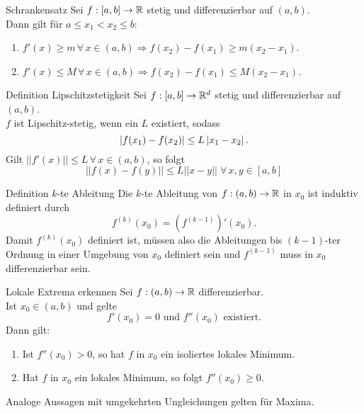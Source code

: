 \documentclass[main.tex]{subfiles}
\begin{document}
\begin{karte}{Schrankensatz}
    Sei \( f: [a,b] \rightarrow \mathbb{R} \) stetig und differenzierbar 
    auf \( (a,b) \).\\
    Dann gilt für \( a \leq x_1 < x_2 \leq b \): 
    \begin{enumerate}
        \item \( f'(x) \geq m \,\forall \, x \in (a,b) 
        \Rightarrow f(x_2) - f(x_1) \geq m(x_2 - x_1) \).
        \item \( f'(x) \leq M \, \forall \, x\in (a,b) 
        \Rightarrow f(x_2) - f(x_1) \leq M(x_2 - x_1) \).
    \end{enumerate}
\end{karte}
\begin{karte}{Definition Lipschitzstetigkeit}
    Sei \( f: [a,b] \rightarrow \mathbb{R}^d \) stetig und 
    differenzierbar auf \( (a,b) \). \\
    \( f \) ist Lipschitz-stetig, wenn ein \(L\) 
    existiert, sodass 
    \[ \left|  f(x_1) - f(x_2)  \right| \leq L \left| x_1 - x_2 \right|. \]
    Gilt \( ||f'(x)|| \leq L \, \forall \, x \in (a,b) \), 
    so folgt 
    \[ ||f(x) - f(y)|| \leq L ||x-y|| 
    \; \forall \, x,y \in [a,b] \]
\end{karte}
\begin{karte}{Definition \(k\)-te Ableitung}
    Die \( k \)-te Ableitung von 
    \( f: (a,b) \rightarrow \mathbb{R} \) in \( x_0 \) ist 
    induktiv definiert durch 
    \[ f^{(k)}(x_0) = (f^{(k-1)})'(x_0). \]
    Damit \( f^{(k)}(x_0) \) definiert ist, müssen 
    also die Ableitungen bis \( (k-1) \)-ter Ordnung 
    in einer Umgebung von \( x_0 \) definiert sein und 
    \( f^{(k-1)} \) muss in \( x_0 \) differenzierbar sein.
\end{karte}
\begin{karte}{Lokale Extrema erkennen}
    Sei \( f: (a,b) \rightarrow \mathbb{R} \) differenzierbar. \\
    Ist \( x_0 \in (a,b) \) und gelte 
    \[ f'(x_0) = 0 \text{ und } f''(x_0) \text{ existiert.} \]
    Dann gilt:
    \begin{enumerate}
        \item Ist \( f''(x_0) > 0 \), so hat \( f \) in 
        \( x_0 \) ein isoliertes lokales Minimum.
        \item Hat \( f \) in \( x_0 \) ein lokales 
        Minimum, so folgt \( f''(x_0) \geq 0 \).
    \end{enumerate}
    Analoge Aussagen mit umgekehrten Ungleichungen gelten 
    für Maxima.
\end{karte}
\end{document}
